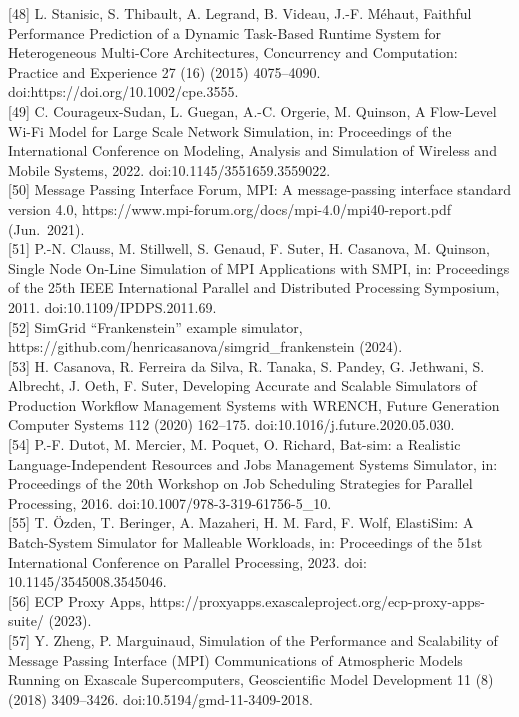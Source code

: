 \documentclass[
]{article}
\begin{document}
{[}48{]} L. Stanisic, S. Thibault, A. Legrand, B. Videau, J.-F. Méhaut,
Faithful Performance Prediction of a Dynamic Task-Based Runtime System
for Heterogeneous Multi-Core Architectures, Concurrency and Computation:
Practice and Experience 27 (16) (2015) 4075--4090.
doi:https://doi.org/10.1002/cpe.3555.\\
{[}49{]} C. Courageux-Sudan, L. Guegan, A.-C. Orgerie, M. Quinson, A
Flow-Level Wi-Fi Model for Large Scale Network Simulation, in:
Proceedings of the International Conference on Modeling, Analysis and
Simulation of Wireless and Mobile Systems, 2022.
doi:10.1145/3551659.3559022.\\
{[}50{]} Message Passing Interface Forum, MPI: A message-passing
interface standard version 4.0,
https://www.mpi-forum.org/docs/mpi-4.0/mpi40-report.pdf (Jun.~2021).\\
{[}51{]} P.-N. Clauss, M. Stillwell, S. Genaud, F. Suter, H. Casanova,
M. Quinson, Single Node On-Line Simulation of MPI Applications with
SMPI, in: Proceedings of the 25th IEEE International Parallel and
Distributed Processing Symposium, 2011. doi:10.1109/IPDPS.2011.69.\\
{[}52{]} SimGrid ``Frankenstein'' example simulator,
https://github.com/henricasanova/simgrid\_frankenstein (2024).\\
{[}53{]} H. Casanova, R. Ferreira da Silva, R. Tanaka, S. Pandey, G.
Jethwani, S. Albrecht, J. Oeth, F. Suter, Developing Accurate and
Scalable Simulators of Production Workflow Management Systems with
WRENCH, Future Generation Computer Systems 112 (2020) 162--175.
doi:10.1016/j.future.2020.05.030.\\
{[}54{]} P.-F. Dutot, M. Mercier, M. Poquet, O. Richard, Bat-sim: a
Realistic Language-Independent Resources and Jobs Management Systems
Simulator, in: Proceedings of the 20th Workshop on Job Scheduling
Strategies for Parallel Processing, 2016.
doi:10.1007/978-3-319-61756-5\_10.\\
{[}55{]} T. Özden, T. Beringer, A. Mazaheri, H. M. Fard, F. Wolf,
ElastiSim: A Batch-System Simulator for Malleable Workloads, in:
Proceedings of the 51st International Conference on Parallel Processing,
2023. doi: 10.1145/3545008.3545046.\\
{[}56{]} ECP Proxy Apps,
https://proxyapps.exascaleproject.org/ecp-proxy-apps-suite/ (2023).\\
{[}57{]} Y. Zheng, P. Marguinaud, Simulation of the Performance and
Scalability of Message Passing Interface (MPI) Communications of
Atmospheric Models Running on Exascale Supercomputers, Geoscientific
Model Development 11 (8) (2018) 3409--3426.
doi:10.5194/gmd-11-3409-2018.
\end{document}
